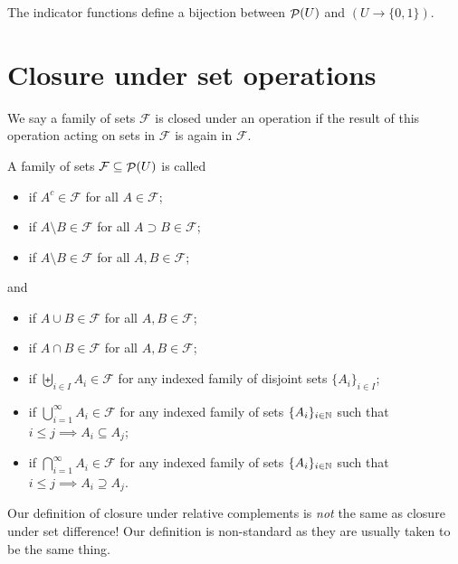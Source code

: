 \begin{proposition}
The indicator functions define a bijection between $\mathop{\mathcal{P}}(U)$ and $(U\to \{0,1\})$.
\end{proposition}

\section{Closure under set operations}
We say a family of sets $\mathcal{F}$ is closed under an operation if the result of this operation acting on sets in $\mathcal{F}$ is again in $\mathcal{F}$.

\begin{definition}
A family of sets $\mathcal{F}\subseteq\mathop{\mathcal{P}}(U)$ is called
\begin{itemize}
\item {} if $A^c\in\mathcal{F}$ for all $A\in\mathcal{F}$;
\item {} if $A\setminus B\in\mathcal{F}$ for all $A \supset B\in\mathcal{F}$;
\item {} if $A\setminus B\in\mathcal{F}$ for all $A, B\in\mathcal{F}$;
\end{itemize}
and
\begin{itemize}
\item {} if $A\cup B \in\mathcal{F}$ for all $A,B\in\mathcal{F}$;
\item {} if $A\cap B \in\mathcal{F}$ for all $A,B\in\mathcal{F}$;
\item {} if $\biguplus_{i\in I}A_i \in\mathcal{F}$ for any indexed family of disjoint sets $\{A_i\}_{i\in I}$;
\item {} if $\bigcup_{i=1}^\infty A_i \in\mathcal{F}$ for any indexed family of sets $\{A_i\}_{i\in \mathbb{N}}$ such that $i\leq j \implies A_i \subseteq A_j$;
\item {} if $\bigcap_{i=1}^\infty A_i \in\mathcal{F}$ for any indexed family of sets $\{A_i\}_{i\in \mathbb{N}}$ such that $i\leq j \implies A_i \supseteq A_j$.
\end{itemize}
Our definition of closure under relative complements is \emph{not} the same as closure under set difference! Our definition is non-standard as they are usually taken to be the same thing.
\end{definition}


